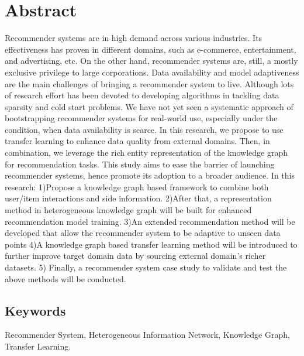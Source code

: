 \section*{Abstract}
Recommender systems are in high demand across various industries. Its effectiveness has proven in different domains, such as e-commerce, entertainment, and advertising, etc. On the other hand, recommender systems are, still, a mostly exclusive privilege to large corporations. Data availability and model adaptiveness are the main challenges of bringing a recommender system to live. Although lots of research effort has been devoted to developing algorithms in tackling data sparsity and cold start problems. We have not yet seen a systematic approach of bootstrapping recommender systems for real-world use, especially under the condition, when data availability is scarce. In this research, we propose to use transfer learning to enhance data quality from external domains. Then, in combination, we leverage the rich entity representation of the knowledge graph for recommendation tasks. This study aims to ease the barrier of launching recommender systems, hence promote its adoption to a broader audience. In this research: 1)Propose a knowledge graph based framework to combine both user/item interactions and side information. 2)After that, a representation method in heterogeneous knowledge graph will be built for enhanced recommendation model training. 3)An extended recommendation method will be developed that allow the recommender system to be adaptive to unseen data points 4)A knowledge graph based transfer learning method will be introduced to further improve target domain data by sourcing external domain's richer datasets. 5) Finally, a recommender system case study to validate and test the above methods will be conducted.

\subsection*{Keywords} 
Recommender System, Heterogeneous Information Network, Knowledge Graph, Transfer Learning. 